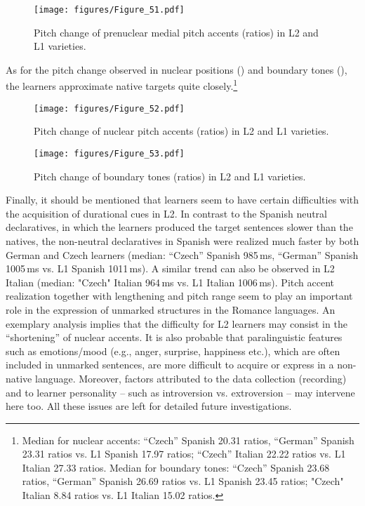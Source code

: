 \begin{figure}
\texttt{[image: figures/Figure\_51.pdf]}
\caption{Pitch change of prenuclear medial pitch accents (ratios) in L2 and L1 varieties.}
\label{fig:4.51}
\end{figure}

As for the pitch change observed in nuclear positions () and boundary tones (), the learners approximate native targets quite closely.\footnote{Median for nuclear accents: “Czech” Spanish 20.31 ratios, “German” Spanish 23.31 ratios vs. L1 Spanish 17.97 ratios; “Czech” Italian 22.22 ratios vs. L1 Italian 27.33 ratios. Median for boundary tones: “Czech” Spanish 23.68 ratios, “German” Spanish 26.69 ratios vs. L1 Spanish 23.45 ratios; "Czech" Italian 8.84 ratios vs. L1 Italian 15.02 ratios.}


\begin{figure}
\texttt{[image: figures/Figure\_52.pdf]}
\caption{Pitch change of nuclear pitch accents (ratios) in L2 and L1 varieties.}
\label{fig:4.52}
\end{figure}

\begin{figure}
\texttt{[image: figures/Figure\_53.pdf]}
\caption{Pitch change of boundary tones (ratios) in L2 and L1 varieties.}
\label{fig:4.53}
\end{figure}

Finally, it should be mentioned that learners seem to have certain difficulties with the acquisition of durational cues in L2. In contrast to the Spanish neutral declaratives, in which the learners produced the target sentences slower than the natives, the non-neutral declaratives in Spanish were realized much faster by both German and Czech learners (median: “Czech” Spanish 985\,ms, “German” Spanish 1005\,ms vs. L1 Spanish 1011\,ms). A similar trend can also be observed in L2 Italian (median: "Czech" Italian 964\,ms vs. L1 Italian 1006\,ms). Pitch accent realization together with lengthening and pitch range seem to play an important role in the expression of unmarked structures in the Romance languages. An exemplary analysis implies that the difficulty for L2 learners may consist in the “shortening” of nuclear accents. It is also probable that paralinguistic features such as emotions/mood (e.g., anger, surprise, happiness etc.), which are often included in unmarked sentences, are more difficult to acquire or express in a  non-native language. Moreover, factors attributed to the data collection (recording) and to learner personality -- such as introversion vs. extroversion -- may intervene here too. All these issues are left for detailed future investigations.

